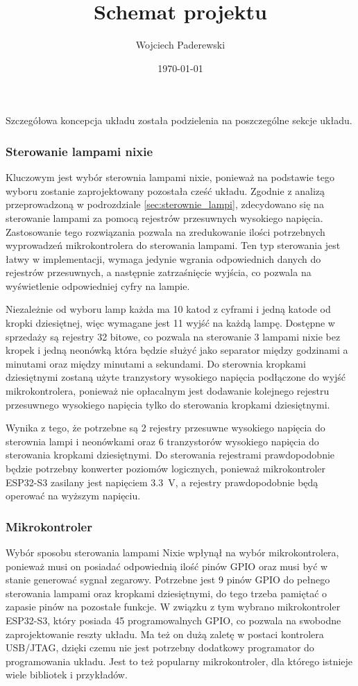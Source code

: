 \documentclass[../main.tex]{subfiles}
\author{Wojciech Paderewski}
\date{\today}
\title{Schemat projektu}
\begin{document}
Szczegółowa koncepcja układu została podzielenia na poszczególne sekcje układu.

\subsubsection{Sterowanie lampami nixie}
Kluczowym jest wybór sterownia lampami nixie, ponieważ na podstawie tego wyboru zostanie zaprojektowany pozostała cześć układu.
Zgodnie z analizą przeprowadzoną w podrozdziale \ref{sec:sterownie_lampi}, zdecydowano się na sterowanie lampami za pomocą rejestrów przesuwnych wysokiego napięcia.
Zastosowanie tego rozwiązania pozwala na zredukowanie ilości potrzebnych wyprowadzeń mikrokontrolera do sterowania lampami. Ten typ sterowania jest łatwy w implementacji,
wymaga jedynie wgrania odpowiednich danych do rejestrów przesuwnych, a następnie zatrzaśnięcie
 wyjścia, co pozwala na wyświetlenie odpowiedniej cyfry na lampie.

Niezależnie od wyboru lamp każda ma 10 katod z cyframi i jedną katode od kropki dziesiętnej, więc wymagane jest 11 wyjść na każdą lampę.
Dostępne w sprzedaży są rejestry 32 bitowe, co pozwala na sterowanie 3 lampami nixie bez kropek i jedną neonówką która będzie
służyć jako separator między godzinami a minutami oraz między minutami a sekundami. Do sterownia kropkami dziesiętnymi zostaną użyte tranzystory wysokiego napięcia podłączone do wyjść mikrokontrolera,
ponieważ nie opłacalnym jest dodawanie kolejnego rejestru przesuwnego wysokiego napięcia tylko do sterowania kropkami dziesiętnymi.

Wynika z tego, że potrzebne są 2 rejestry przesuwne wysokiego napięcia do sterownia lampi i neonówkami oraz 6 tranzystorów wysokiego napięcia do sterowania kropkami dziesiętnymi.
Do sterowania rejestrami prawdopodobnie będzie potrzebny konwerter poziomów logicznych, ponieważ mikrokontroler ESP32-S3 zasilany jest napięciem \SI{3.3}{\volt}, a rejestry prawdopodobnie będą operować na wyższym napięciu.
\subsubsection{Mikrokontroler}
Wybór sposobu sterowania lampami Nixie wpłynął na wybór mikrokontrolera, ponieważ musi on posiadać odpowiednią ilość pinów GPIO oraz musi być w stanie generować sygnał zegarowy.
Potrzebne jest 9 pinów GPIO do pełnego sterowania lampami oraz kropkami dziesiętnymi, do tego trzeba pamiętać o zapasie pinów na pozostałe funkcje. W związku z tym
wybrano mikrokontroler ESP32-S3, który posiada 45 programowalnych GPIO, co pozwala na swobodne zaprojektowanie reszty układu. Ma też on dużą zaletę w postaci kontrolera USB/JTAG,
dzięki czemu nie jest potrzebny dodatkowy programator do programowania układu. Jest to też popularny mikrokontroler, dla którego istnieje wiele bibliotek i przykładów.
\end{document}
